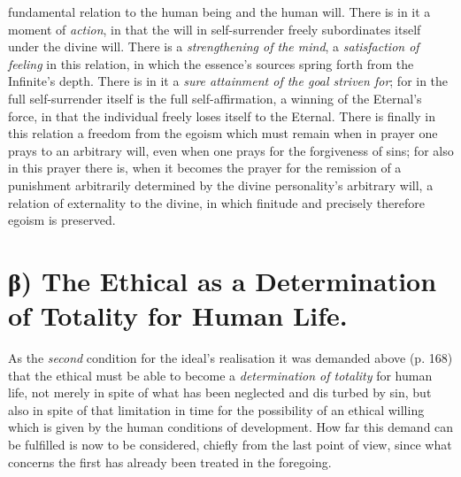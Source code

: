 \documentclass[12pt,a4paper]{book}
\begin{document}
fundamental relation to the human being and the human will. There is in it a
moment of \emph{action}, in that the will in self-surrender freely subordinates
itself under the divine will. There is a \emph{strengthening of the mind}, a
\emph{satisfaction of feeling} in this relation, in which the essence's sources
spring forth from the Infinite's depth. There is in it a \emph{sure attainment
of the goal striven for}; for in the full self-surrender itself is the full
self-affirmation, a winning of the Eternal's force, in that the individual
freely loses itself to the Eternal. There is finally in this relation a freedom
from the egoism which must remain when in prayer one prays to an arbitrary will,
even when one prays for the forgiveness of sins; for also in this prayer there
is, when it becomes the prayer for the remission of a punishment arbitrarily
determined by the divine personality's arbitrary will, a relation of externality
to the divine, in which finitude and precisely therefore egoism is preserved.

\section*{β) The Ethical as a Determination of Totality for Human Life.}

As the \emph{second} condition for the ideal's realisation it was demanded above
(p. 168) that the ethical must be able to become a \emph{determination of
totality} for human life, not merely in spite of what has been neglected and
dis\-%
turbed by sin, but also in spite of that limitation in time for the possibility
of an ethical willing which is given by the human conditions of development. How
far this demand can be fulfilled is now to be considered, chiefly from the last
point of view, since what concerns the first has already been treated in the
foregoing.
\end{document}

